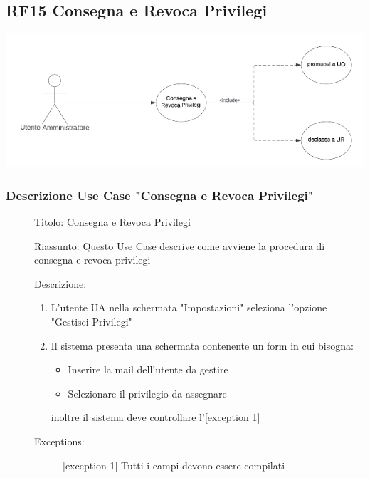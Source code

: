 \documentclass{article}
\let\origthesubsection\thesubsection
\begin{document}
\subsection{RF15 Consegna e Revoca Privilegi}
\begin{center}
    \item[] \includegraphics[scale=0.5]{UseCase_5.png}
\end{center}
\subsubsection*{Descrizione Use Case "Consegna e Revoca Privilegi"}
\begin{description}
    \item[] Titolo: Consegna e Revoca Privilegi
    \item[] Riassunto: Questo Use Case descrive come avviene la procedura di consegna e revoca privilegi
    \item[] Descrizione:
        \begin{enumerate}
            \item L'utente UA nella schermata "Impostazioni" seleziona l'opzione "Gestisci Privilegi"
            \item Il sistema presenta una schermata contenente un form in cui bisogna:
                  \begin{itemize}
                      \item Inserire la mail dell'utente da gestire
                      \item Selezionare il privilegio da assegnare
                  \end{itemize}
                  inoltre il sistema deve controllare l'\hyperref[exc:15.1]{[exception 1]}
        \end{enumerate}
    \item[] Exceptions:
        \begin{description}
            \item[] \label{exc:15.1} [exception 1] Tutti i campi devono essere compilati
        \end{description}
\end{description}
\renewcommand\thesubsection{\origthesubsection}
\clearpage
\end{document}
